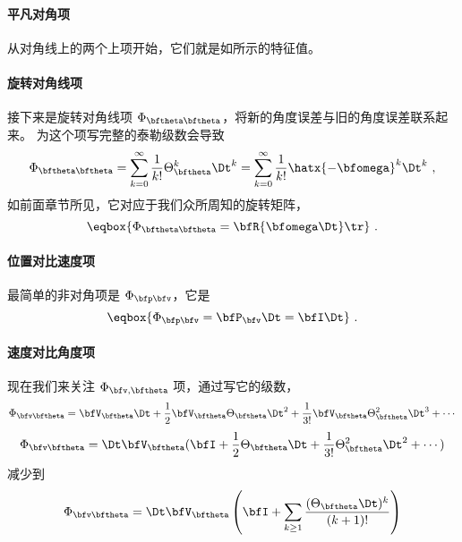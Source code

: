 \paragraph{平凡对角项}
从对角线上的两个上项开始，它们就是如所示的特征值。 

\paragraph{旋转对角线项}
接下来是旋转对角线项 $\Phi_{\bftheta\bftheta}$，将新的角度误差与旧的角度误差联系起来。 
为这个项写完整的泰勒级数会导致
%
\begin{equation}
\Phi_{\bftheta\bftheta} = 
\sum_{k=0}^\infty \frac{1}{k!}\Theta_\bftheta^k \Dt^k = \sum_{k=0}^\infty \frac{1}{k!}\hatx{-\bfomega}^k \Dt^k ~, \label{equ:thetaThetaSeries}
\end{equation}
%
如前面章节所见，它对应于我们众所周知的旋转矩阵，
%
\begin{equation}
\eqbox{\Phi_{\bftheta\bftheta} = \bfR\{\bfomega\Dt\}\tr}~.
\end{equation}

\paragraph{位置对比速度项}
最简单的非对角项是 $\Phi_{\bfp\bfv}$，它是
%
\begin{equation}
\eqbox{\Phi_{\bfp\bfv} = \bfP_\bfv\Dt = \bfI\Dt}~.
\end{equation}

\paragraph{速度对比角度项}
现在我们来关注 $\Phi_{\bfv, \bftheta}$ 项，通过写它的级数，
%
\begin{equation}
\Phi_{\bfv\bftheta} = \bfV_\bftheta\Dt 
+ \frac{1}{2}\bfV_\bftheta\Theta_\bftheta\Dt^2 
+ \frac{1}{3!}\bfV_\bftheta\Theta_\bftheta^2\Dt^3
+\cdots
\end{equation}
%
\begin{equation}
\Phi_{\bfv\bftheta} = \Dt\bfV_\bftheta( \bfI 
+ \frac{1}{2}\Theta_\bftheta\Dt 
+ \frac{1}{3!}\Theta_\bftheta^2\Dt^2
+\cdots)
\end{equation}
%
减少到
%
\begin{equation}
\Phi_{\bfv\bftheta} = \Dt\bfV_\bftheta\left( \bfI 
+ \sum_{k\ge1}\frac{(\Theta_\bftheta\Dt)^k}{(k+1)!} 
\right)
\end{equation}


